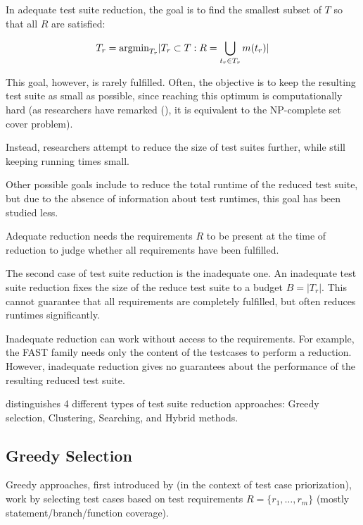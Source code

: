 In adequate test suite reduction, the goal is to find the smallest subset
of $T$ so that all $R$ are satisfied:

$$T_{r}=\hbox{argmin}_{T_{r}} |T_{r} \subset T: R=\bigcup_{t_{r} \in T_{r}} m(t_{r})|$$

This goal, however, is rarely fulfilled. Often, the objective is to
keep the resulting test suite as small as possible, since reaching
this optimum is computationally hard (as researchers have remarked
(\cite{khan2016survey}), it is equivalent to the NP-complete set cover
problem). %

Instead, researchers attempt to reduce the size of test suites further,
while still keeping running times small.

Other possible goals include to reduce the total runtime of the reduced
test suite, but due to the absence of information about test runtimes,
this goal has been studied less. %

Adequate reduction needs the requirements $R$ to be present at the time
of reduction to judge whether all requirements have been fulfilled.

The second case of test suite reduction is the inadequate one. An
inadequate test suite reduction fixes the size of the reduce test suite
to a budget $B=|T_{r}|$. This cannot guarantee that all requirements
are completely fulfilled, but often reduces runtimes significantly.

Inadequate reduction can work without access to the requirements.
For example, the FAST family needs only the content of the testcases to
perform a reduction. However, inadequate reduction gives no guarantees
about the performance of the resulting reduced test suite.

\cite{khan2018systematic} distinguishes 4 different types of test
suite reduction approaches: Greedy selection, Clustering, Searching,
and Hybrid methods.

\subsection{Greedy Selection}

Greedy approaches, first introduced by \cite{rothermel2001prioritizing}
(in the context of test case priorization), work by selecting test
cases based on test requirements $R=\{r_1, \dots, r_{m}\}$ (mostly
statement/branch/function coverage).

